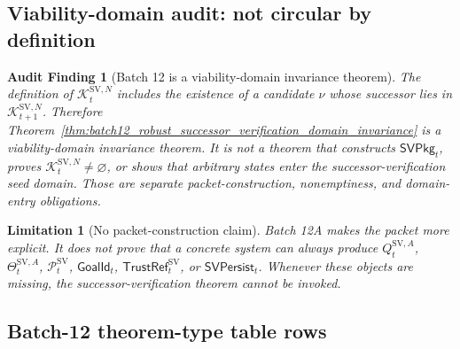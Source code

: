 \documentclass[11pt]{article}
\newtheorem{limitation}[theorem]{Limitation}
\newcommand{\Pcal}{\mathcal{P}}
\newcommand{\1}{\mathbf{1}}
\newtheorem{audit}[theorem]{Audit Finding}
\providecommand{\Kcal}{\mathcal{K}}
\begin{document}
\subsection{Viability-domain audit: not circular by definition}

\begin{audit}[Batch 12 is a viability-domain invariance theorem]
\label{audit:batch12a_not_circular_by_definition}
The definition of \(\Kcal_t^{\mathrm{SV},N}\) includes the existence of a candidate \(\nu\) whose successor lies in \(\Kcal_{t+1}^{\mathrm{SV},N}\).  Therefore Theorem~\ref{thm:batch12_robust_successor_verification_domain_invariance} is a viability-domain invariance theorem.  It is not a theorem that constructs \(\mathsf{SVPkg}_t\), proves \(\Kcal_t^{\mathrm{SV},N}\neq\varnothing\), or shows that arbitrary states enter the successor-verification seed domain.  Those are separate packet-construction, nonemptiness, and domain-entry obligations.
\end{audit}

\begin{limitation}[No packet-construction claim]
\label{lim:batch12a_no_packet_construction_claim}
Batch 12A makes the packet more explicit.  It does not prove that a concrete system can always produce \(Q_t^{\mathrm{SV},A}\), \(\Theta_t^{\mathrm{SV},A}\), \(\Pcal_t^{\mathrm{SV}}\), \(\mathsf{GoalId}_t\), \(\mathsf{TrustRef}_t^{\mathrm{SV}}\), or \(\mathsf{SVPersist}_t\).  Whenever these objects are missing, the successor-verification theorem cannot be invoked.
\end{limitation}


\subsection{Batch-12 theorem-type table rows}
\end{document}
